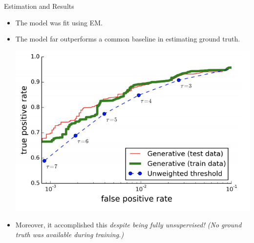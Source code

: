 \documentclass[10pt]{beamer}
\begin{document}
\begin{frame}{Estimation and Results}

\begin{itemize}
\item The model was fit using EM.
\item The model far outperforms a common baseline in estimating ground truth.
\begin{center}
\includegraphics[width=.6\textwidth]{images/kantchelian_performance}
\end{center}
\item Moreover, it accomplished this \it{despite being fully unsupervised}!  (No ground truth was available during training.)
\end{itemize}

\end{frame}

%
%
%
\end{document}
